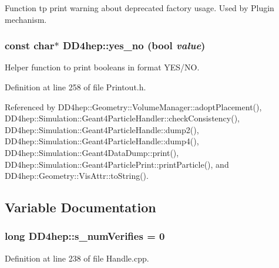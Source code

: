 Function tp print warning about deprecated factory usage. Used by Plugin mechanism. \hypertarget{namespace_d_d4hep_a9b6e2c5ab00340e93017e18604b0cb85}{
\subsubsection[{yes\_\-no}]{\setlength{\rightskip}{0pt plus 5cm}const char$\ast$ DD4hep::yes\_\-no (bool {\em value})}}
\label{namespace_d_d4hep_a9b6e2c5ab00340e93017e18604b0cb85}


Helper function to print booleans in format YES/NO. 

Definition at line 258 of file Printout.h.

Referenced by DD4hep::Geometry::VolumeManager::adoptPlacement(), DD4hep::Simulation::Geant4ParticleHandler::checkConsistency(), DD4hep::Simulation::Geant4ParticleHandle::dump2(), DD4hep::Simulation::Geant4ParticleHandle::dump4(), DD4hep::Simulation::Geant4DataDump::print(), DD4hep::Simulation::Geant4ParticlePrint::printParticle(), and DD4hep::Geometry::VisAttr::toString().

\subsection{Variable Documentation}
\hypertarget{namespace_d_d4hep_afc2f0d9d3dc77e8a9b1a06b7cd0404f0}{
\subsubsection[{s\_\-numVerifies}]{\setlength{\rightskip}{0pt plus 5cm}long {\bf DD4hep::s\_\-numVerifies} = 0}}
\label{namespace_d_d4hep_afc2f0d9d3dc77e8a9b1a06b7cd0404f0}


Definition at line 238 of file Handle.cpp.